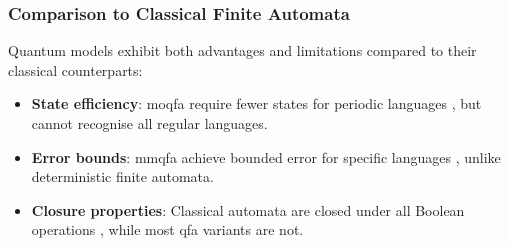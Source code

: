 \subsubsection*{Comparison to Classical Finite Automata}
\label{subsec:classical-comparison}
Quantum models exhibit both advantages and limitations compared to their classical counterparts:
\begin{itemize}
    \item \textbf{State efficiency}: \gls{moqfa} require fewer states for periodic languages \cite{kondacs1997power}, but cannot recognise all regular languages.
    \item \textbf{Error bounds}: \gls{mmqfa} achieve bounded error for specific languages \cite{ambainis1998}, unlike deterministic finite automata.
    \item \textbf{Closure properties}: Classical automata are closed under all Boolean operations \cite{rabin1959}, while most \gls{qfa} variants are not.
\end{itemize}

